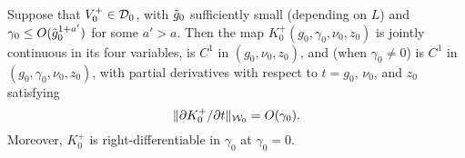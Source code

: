 \begin{prop}
\label{prop:Ksmooth}
Suppose that $V_0^+ \in \mathcal{D}_0$, with $\tilde{g}_0$ sufficiently small
(depending on $L$) and
$\gamma_0 \le O(\tilde{g}_0^{1+a'})$ for some $a' >a$.
Then the map $K^+_0(g_0, \gamma_0, \nu_0, z_0)$ is jointly continuous
in its four variables, is $C^1$ in $(g_0, \nu_0, z_0)$,
and (when $\gamma_0 \ne 0$) is $C^1$ in $(g_0, \gamma_0, \nu_0, z_0)$,
with partial derivatives with respect to $t = g_0$, $\nu_0$, and $z_0$ satisfying
\begin{equation}
\label{e:ddpK}
\|\partial K^+_0 / \partial t\|_{\mathcal{W}_0} = O(\gamma_0).
\end{equation}
Moreover, $K^+_0$ is %
right-differentiable in $\gamma_0$ at $\gamma_0 = 0$.
\end{prop}

